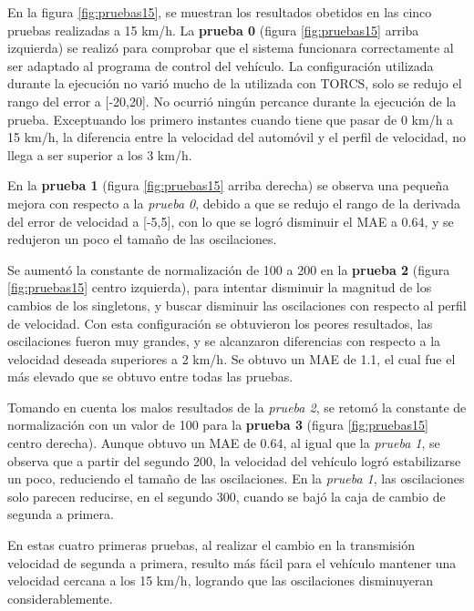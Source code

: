 En la figura \ref{fig:pruebas15}, se muestran los resultados obetidos en las cinco pruebas realizadas a 15 km/h. La \textbf{prueba 0} (figura \ref{fig:pruebas15} arriba izquierda) se realizó para comprobar que el sistema funcionara correctamente al ser adaptado al programa de control del vehículo. La configuración utilizada durante la ejecución no varió mucho de la utilizada con \gls{TORCS}, solo se redujo el rango del error a [-20,20]. No ocurrió ningún percance durante la ejecución de la prueba. Exceptuando los primero instantes cuando tiene que pasar de 0 km/h a 15 km/h, la diferencia entre la velocidad del automóvil y el perfil de velocidad, no llega a ser superior a los 3 km/h. 

En la \textbf{prueba 1} (figura \ref{fig:pruebas15} arriba derecha) se observa una pequeña mejora con respecto a la \textit{prueba 0}, debido a que se redujo el rango de la derivada del error de velocidad a [-5,5], con lo que se logró disminuir el \gls{MAE} a 0.64, y se redujeron un poco el tamaño de las oscilaciones.

Se aumentó la constante de normalización de 100 a 200 en la \textbf{prueba 2} (figura \ref{fig:pruebas15} centro izquierda), para intentar disminuir la magnitud de los cambios de los singletons, y buscar disminuir las oscilaciones con respecto al perfil de velocidad. Con esta configuración se obtuvieron los peores resultados, las oscilaciones fueron muy grandes, y se alcanzaron diferencias con respecto a la velocidad deseada superiores a 2 km/h. Se obtuvo un \gls{MAE} de 1.1, el cual fue el más elevado que se obtuvo entre todas las pruebas.

Tomando en cuenta los malos resultados de la \textit{prueba 2}, se retomó la constante de normalización con un valor de 100 para la \textbf{prueba 3} (figura \ref{fig:pruebas15} centro derecha). Aunque obtuvo un \gls{MAE} de 0.64, al igual que la \textit{prueba 1}, se observa que a partir del segundo 200, la velocidad del vehículo logró estabilizarse un poco, reduciendo el tamaño de las oscilaciones. En la \textit{prueba 1}, las oscilaciones solo parecen reducirse, en el segundo 300, cuando se bajó la caja de cambio de segunda a primera.    

En estas cuatro primeras pruebas, al realizar el cambio en la transmisión velocidad de segunda a primera, resulto más fácil para el vehículo mantener una velocidad cercana a los 15 km/h, logrando que las oscilaciones disminuyeran considerablemente.

